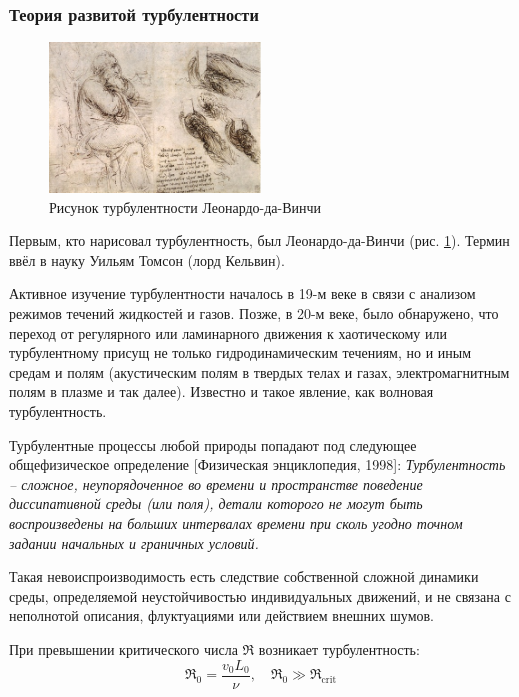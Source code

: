 \subsubsection{Теория развитой турбулентности}
\begin{figure}[H]
	\centering
	\includegraphics[width=0.5\textwidth]{photo/leo.jpg}
	\caption{Рисунок турбулентности Леонардо-да-Винчи}
	\label{fig:leo}
\end{figure}
Первым, кто нарисовал турбулентность, был Леонардо-да-Винчи (рис. \ref{fig:leo}). Термин
ввёл в науку Уильям Томсон (лорд Кельвин). 

Активное изучение турбулентности началось в 19-м веке в связи с анализом режимов течений жидкостей и газов. Позже, в 20-м веке, было обнаружено, что переход от регулярного или ламинарного движения к хаотическому или турбулентному присущ не только гидродинамическим течениям, но и иным средам и полям (акустическим полям в твердых телах и газах, электромагнитным полям в плазме и так далее). Известно и такое явление, как волновая турбулентность.

Турбулентные процессы любой природы попадают под следующее общефизическое определение [Физическая энциклопедия, 1998]:
\textit{Турбулентность -- сложное, неупорядоченное во времени и 
 пространстве поведение диссипативной среды (или поля), 
 детали которого не могут быть воспроизведены на больших 
 интервалах времени при сколь угодно точном задании 
 начальных и граничных условий.}


Такая невоиспроизводимость есть следствие собственной сложной динамики среды, определяемой неустойчивостью индивидуальных движений, и не связана с неполнотой описания, флуктуациями или действием внешних шумов.

При превышении критического числа $\Re$ возникает турбулентность:
\begin{equation}
    \Re_0 = \frac{v_0 L_0}{\nu}, \quad \Re_0 \gg \Re_\text{crit}
\end{equation}

